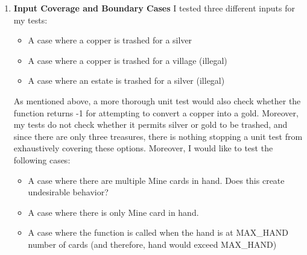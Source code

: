 \documentclass[11pt,letterpaper]{article}
\begin{document}
\begin{enumerate}[label=\Roman*.]
\begin{itemize}[leftmargin=*]
\begin{enumerate}[leftmargin=*]
        \item \textbf{Input Coverage and Boundary Cases}
          I tested three different inputs for my tests: 
          \begin{itemize}
            \item A case where a copper is trashed for a silver
            \item A case where a copper is trashed for a village (illegal)
            \item A case where an estate is trashed for a silver (illegal)
          \end{itemize}
          As mentioned above, a more thorough unit test would also check whether the function
            returns -1 for attempting to convert a copper into a gold. Moreover, 
            my tests do not check whether it permits silver or gold to be trashed, and since
            there are only three treasures, there is nothing stopping a unit test from 
            exhaustively covering these options. Moreover, I would like to test the following
            cases:
          \begin{itemize}
            \item A case where there are multiple Mine cards in hand. Does this create
              undesirable behavior?
            \item A case where there is only Mine card in hand.
            \item A case where the function is called when the hand is at MAX\_HAND number of cards (and therefore, hand would exceed MAX\_HAND)
          \end{itemize}
        \end{enumerate}

    \end{itemize}

\end{enumerate}
\end{document}
